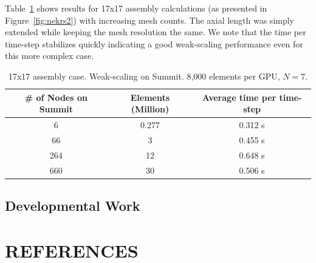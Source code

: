 \documentclass[11pt,letterpaper,english]{article}
\begin{document}
Table~\ref{wscaling2} shows results for 17x17 assembly calculations (as presented in Figure~\ref{fig:nekrs2}) with increasing mesh counts. The axial length was simply extended while keeping the mesh resolution the same. We note that the time per time-step stabilizes quickly indicating a good weak-scaling performance even for this more complex case.

\begin{table} [!h]
\begin{center} \begin{tabular}{ccc}
 \hline
\# of Nodes on Summit & Elements (Million) &  Average time per time-step \\
 \hline
6	  & 0.277	& 0.312 s \\
66    & 3  	    & 0.455 s \\
264   & 12	    & 0.648 s \\
660   & 30	    & 0.506 s \\
\hline
\end{tabular} \end{center}
\caption{\label{wscaling2} 17x17 assembly case. Weak-scaling on Summit. 8,000 elements per GPU, $N=7$.}
\end{table}

\vspace{-.25in}
\subsection{Developmental Work}
\vspace{-.2in}


\vspace{-.15in}
\section{REFERENCES}
\vspace{-.15in}



\renewcommand{\section}[2]{}%




\end{document}
